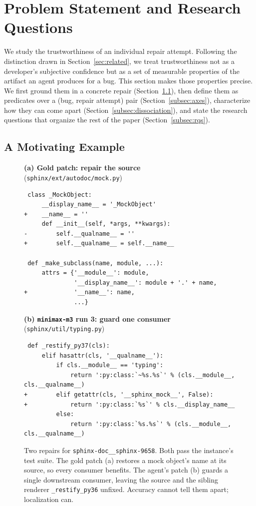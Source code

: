 \section{Problem Statement and Research Questions}
\label{sec:problem}

We study the trustworthiness of an individual repair attempt. Following the distinction
drawn in Section~\ref{sec:related}, we treat trustworthiness not as a developer's
subjective confidence but as a set of measurable properties of the artifact an agent
produces for a bug. This section makes those properties precise. We first ground them in a
concrete repair (Section~\ref{subsec:motivating}), then define them as predicates over a
(bug, repair attempt) pair (Section~\ref{subsec:axes}), characterize how they can come
apart (Section~\ref{subsec:dissociation}), and state the research questions that organize
the rest of the paper (Section~\ref{subsec:rqs}).

\subsection{A Motivating Example}
\label{subsec:motivating}

\begin{figure}[t]
\small
\textbf{(a) Gold patch: repair the source} (\texttt{sphinx/ext/autodoc/mock.py})
\begin{lstlisting}
 class _MockObject:
     __display_name__ = '_MockObject'
+    __name__ = ''
     def __init__(self, *args, **kwargs):
-        self.__qualname__ = ''
+        self.__qualname__ = self.__name__

 def _make_subclass(name, module, ...):
     attrs = {'__module__': module,
              '__display_name__': module + '.' + name,
+             '__name__': name,
              ...}
\end{lstlisting}
\textbf{(b) \texttt{minimax-m3} run 3: guard one consumer} (\texttt{sphinx/util/typing.py})
\begin{lstlisting}
 def _restify_py37(cls):
     elif hasattr(cls, '__qualname__'):
         if cls.__module__ == 'typing':
             return ':py:class:`~%s.%s`' % (cls.__module__, cls.__qualname__)
+        elif getattr(cls, '__sphinx_mock__', False):
+            return ':py:class:`%s`' % cls.__display_name__
         else:
             return ':py:class:`%s.%s`' % (cls.__module__, cls.__qualname__)
\end{lstlisting}
\caption{Two repairs for \texttt{sphinx-doc\_\_sphinx-9658}. Both pass the instance's test
suite. The gold patch (a) restores a mock object's name at its source, so every consumer
benefits. The agent's patch (b) guards a single downstream consumer, leaving the source and
the sibling renderer \texttt{\_restify\_py36} unfixed. Accuracy cannot tell them apart;
localization can.}
\label{fig:motivating}
\end{figure}

